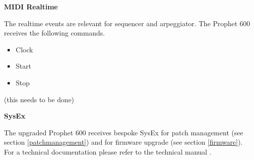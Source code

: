 \textbf{MIDI Realtime}

The realtime events are relevant for sequencer and arpeggiator. The Prophet 600 receives the following commands.

\begin{itemize}
  \item Clock
  \item Start
  \item Stop
\end{itemize}

(this needs to be done)

\textbf{SysEx}

The upgraded Prophet 600 receives bespoke SysEx for patch management (see section \ref{patchmanagement}) and for firmware upgrade (see section \ref{firmware}). For a technical documentation please refer to the technical manual \cite{techmanual}.

\normalsize
